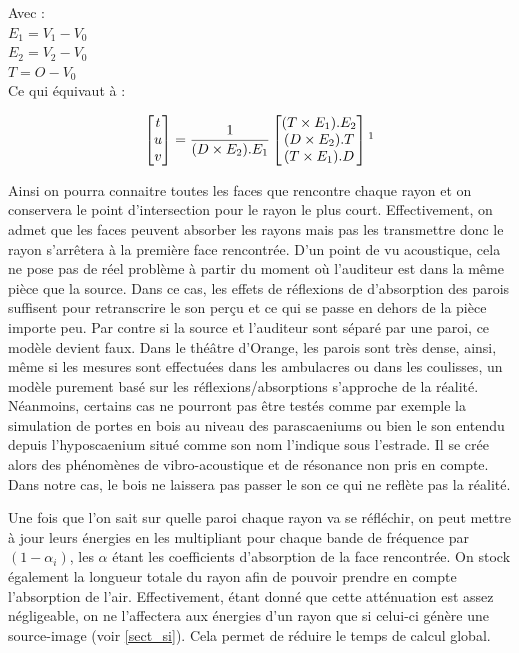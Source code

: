 Avec : \\
$E_1 =  V_1-V_0$ \\
$E_2 =  V_2-V_0$ \\
$T = O - V_0$ \\

Ce qui équivaut à : 

\begin{equation}
	\begin{bmatrix}
 	 t \\
	 u \\
	 v
	\end{bmatrix}
	=
	\frac{1}{
 	  (D \times E_2).E_1
	}
	\begin{bmatrix}
 		  (T \times E_1).E_2
 \\ 
 		  (D \times E_2).T
 \\
 		  (T \times E_1).D
	\end{bmatrix}	
	\footnotemark
\end{equation}

Ainsi on pourra connaitre toutes les faces que rencontre chaque rayon et on conservera le point d'intersection pour le rayon le plus court. Effectivement, on admet que les faces peuvent absorber les rayons mais pas les transmettre donc le rayon s'arrêtera à la première face rencontrée. D'un point de vu acoustique, cela ne pose pas de réel problème à partir du moment où l'auditeur est dans la même pièce que la source. Dans ce cas, les effets de réflexions de d'absorption des parois suffisent pour retranscrire le son perçu et ce qui se passe en dehors de la pièce importe peu. Par contre si la source et l'auditeur sont séparé par une paroi, ce modèle devient faux. Dans le théâtre d'Orange, les parois sont très dense, ainsi, même si les mesures sont effectuées dans les \glspl{ambulacre} ou dans les coulisses, un modèle purement basé sur les réflexions/absorptions s'approche de la réalité. Néanmoins, certains cas ne pourront pas être testés comme par exemple la simulation de portes en bois au niveau des \glspl{parascaenium} ou bien le son entendu depuis l'\gls{hyposcaenium} situé comme son nom l'indique sous l'estrade. Il se crée alors des phénomènes de vibro-acoustique et de résonance non pris en compte. Dans notre cas, le bois ne laissera pas passer le son ce qui ne reflète pas la réalité.

Une fois que l'on sait sur quelle paroi chaque rayon va se réfléchir, on peut mettre à jour leurs énergies en les multipliant pour chaque bande de fréquence par $(1-\alpha_i)$, les $\alpha$ étant les coefficients d'absorption de la face rencontrée. On stock également la longueur totale du rayon afin de pouvoir prendre en compte l'absorption de l'air. Effectivement, étant donné que cette atténuation est assez négligeable, on ne l'affectera aux énergies d'un rayon que si celui-ci génère une source-image (voir \ref{sect_si}). Cela permet de réduire le temps de calcul global. 

